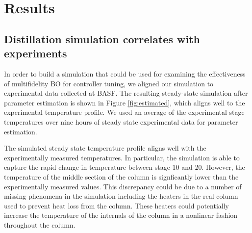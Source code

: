 \section{Results}


\subsection{Distillation simulation correlates with experiments}

In order to build a simulation that could be used for examining the effectiveness of multifidelity BO for controller tuning, we aligned our simulation to experimental data collected at BASF. The resulting steady-state simulation after parameter estimation is shown in Figure \ref{fig:estimated}, which aligns well to the experimental temperature profile. We used an average of the experimental stage temperatures over nine hours of steady state experimental data for parameter estimation. 

The simulated steady state temperature profile aligns well with the experimentally measured temperatures. In particular, the simulation is able to capture the rapid change in temperature between stage 10 and 20. However, the temperature of the middle section of the column is signficantly lower than the experimentally measured values. This discrepancy could be due to a number of missing phenomena in the simulation including the heaters in the real column used to prevent heat loss from the column. These heaters could potentially increase the temperature of the internals of the column in a nonlinear fashion throughout the column. 

